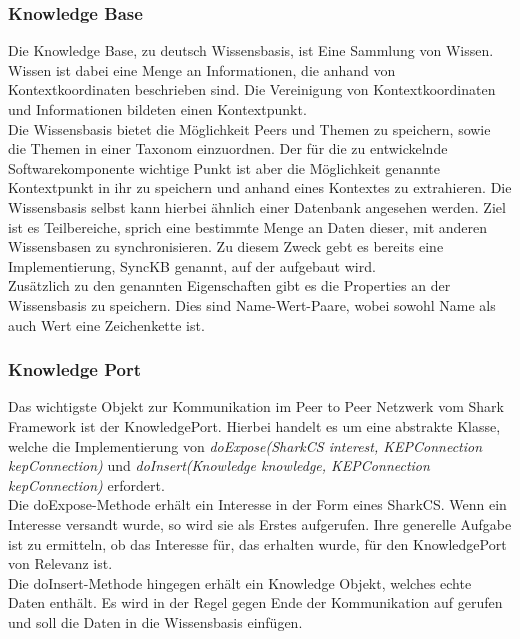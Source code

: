 \documentclass[a4paper]{article}
\begin{document}
	\subsubsection{Knowledge Base} 
	Die Knowledge Base, zu deutsch Wissensbasis, ist Eine Sammlung von Wissen.
	Wissen ist dabei eine Menge an Informationen, die anhand von
	Kontextkoordinaten beschrieben sind. Die Vereinigung von Kontextkoordinaten
	und Informationen bildeten einen Kontextpunkt.\\
	
	Die Wissensbasis bietet die Möglichkeit Peers und Themen zu speichern, sowie
	die Themen in einer Taxonom einzuordnen. Der für die zu entwickelnde
	Softwarekomponente wichtige Punkt ist aber die Möglichkeit genannte
	Kontextpunkt in ihr zu speichern und anhand eines Kontextes zu extrahieren.
	Die Wissensbasis selbst kann hierbei ähnlich einer Datenbank angesehen werden.
	Ziel ist es Teilbereiche, sprich eine bestimmte Menge an Daten dieser, mit
	anderen Wissensbasen zu synchronisieren. Zu diesem Zweck gebt es bereits eine
	Implementierung, SyncKB genannt, auf der aufgebaut wird. \\
	
	Zusätzlich zu den genannten Eigenschaften gibt es die Properties an der
	Wissensbasis zu speichern. Dies sind Name-Wert-Paare, wobei sowohl Name 
	als auch Wert eine Zeichenkette ist.
	
	\subsubsection{Knowledge Port} 
	Das wichtigste Objekt zur Kommunikation im Peer to Peer Netzwerk vom Shark
	Framework ist der KnowledgePort. Hierbei handelt es um eine abstrakte Klasse,
	welche die Implementierung von \emph{doExpose(SharkCS interest, KEPConnection
	kepConnection)} und \emph{doInsert(Knowledge knowledge, KEPConnection
	kepConnection)} erfordert. \\
	
	Die doExpose-Methode erhält ein Interesse in der Form eines SharkCS. Wenn
	ein Interesse versandt wurde, so wird sie als Erstes aufgerufen. Ihre 
	generelle Aufgabe ist zu ermitteln, ob das Interesse für, das erhalten wurde, 
	für den KnowledgePort von Relevanz ist. \\
	
	Die doInsert-Methode hingegen erhält ein Knowledge Objekt, welches echte
	Daten enthält. Es wird in der Regel gegen Ende der Kommunikation auf gerufen
	und soll die Daten in die Wissensbasis einfügen. \\
	
\end{document}
